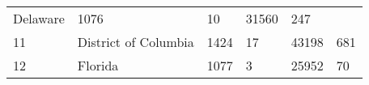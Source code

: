 \documentclass[]{article}
\begin{document}
\begin{longtable}[]{@{}llllll@{}}
\begin{minipage}[t]{0.17\columnwidth}
Delaware\strut
\end{minipage} & \begin{minipage}[t]{0.16\columnwidth}\raggedright
1076\strut
\end{minipage} & \begin{minipage}[t]{0.12\columnwidth}\raggedright
10\strut
\end{minipage} & \begin{minipage}[t]{0.18\columnwidth}\raggedright
31560\strut
\end{minipage} & \begin{minipage}[t]{0.14\columnwidth}\raggedright
247\strut
\end{minipage}\tabularnewline
\begin{minipage}[t]{0.05\columnwidth}\raggedright
11\strut
\end{minipage} & \begin{minipage}[t]{0.17\columnwidth}\raggedright
District of Columbia\strut
\end{minipage} & \begin{minipage}[t]{0.16\columnwidth}\raggedright
1424\strut
\end{minipage} & \begin{minipage}[t]{0.12\columnwidth}\raggedright
17\strut
\end{minipage} & \begin{minipage}[t]{0.18\columnwidth}\raggedright
43198\strut
\end{minipage} & \begin{minipage}[t]{0.14\columnwidth}\raggedright
681\strut
\end{minipage}\tabularnewline
\begin{minipage}[t]{0.05\columnwidth}\raggedright
12\strut
\end{minipage} & \begin{minipage}[t]{0.17\columnwidth}\raggedright
Florida\strut
\end{minipage} & \begin{minipage}[t]{0.16\columnwidth}\raggedright
1077\strut
\end{minipage} & \begin{minipage}[t]{0.12\columnwidth}\raggedright
3\strut
\end{minipage} & \begin{minipage}[t]{0.18\columnwidth}\raggedright
25952\strut
\end{minipage} & \begin{minipage}[t]{0.14\columnwidth}\raggedright
70\strut
\end{minipage}\tabularnewline

\end{longtable}
\end{document}
